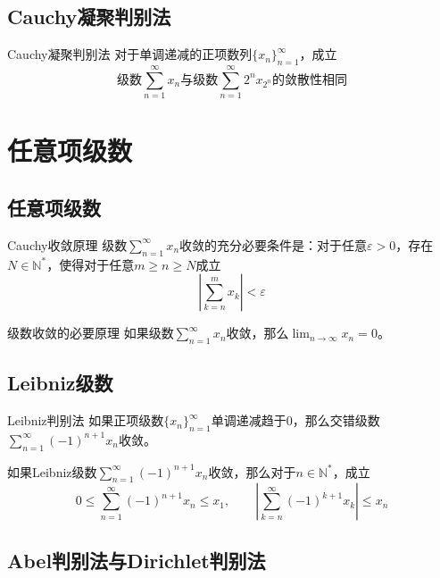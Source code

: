 \documentclass[lang = cn, scheme = chinese, thmcnt = section]{elegantbook}
\newcommand{\N}{\mathbb{N}}            %
\newcommand{\dis}{\displaystyle}
\begin{document}
\subsection{Cauchy凝聚判别法}

\begin{theorem}{Cauchy凝聚判别法}
	对于单调递减的正项数列$\{ x_n \}_{n=1}^{\infty}$，成立%
	$$
	\text{级数}\sum_{n=1}^{\infty}x_n\text{与}
	\text{级数}\sum_{n=1}^{\infty}2^nx_{2^n}\text{的敛散性相同}
	$$
\end{theorem}

\section{任意项级数}

\subsection{任意项级数}

\begin{theorem}{Cauchy收敛原理}
	级数$\dis \sum_{n=1}^{\infty}x_n$收敛的充分必要条件是：对于任意$\varepsilon>0$，存在$N\in\N^*$，使得对于任意$m\ge n\ge N$成立
	$$
	\left| \sum_{k=n}^{m}x_k \right|<\varepsilon
	$$
\end{theorem}

\begin{corollary}{级数收敛的必要原理}
	如果级数$\dis \sum_{n=1}^{\infty}x_n$收敛，那么$\dis \lim_{n\to\infty}x_n=0$。
\end{corollary}

\subsection{Leibniz级数}

\begin{theorem}{Leibniz判别法}
	如果正项级数$\{x_n\}_{n=1}^{\infty}$单调递减趋于$0$，那么交错级数$\dis \sum_{n=1}^{\infty}(-1)^{n+1}x_n$收敛。
\end{theorem}

\begin{corollary}
	如果Leibniz级数$\dis \sum_{n=1}^{\infty}(-1)^{n+1}x_n$收敛，那么对于$n\in\N^*$，成立
	$$
	0\le\sum_{n=1}^{\infty}(-1)^{n+1}x_n\le x_1,\qquad 
	\left| \sum_{k=n}^{\infty}(-1)^{k+1}x_k \right|\le x_n
	$$
\end{corollary}

\subsection{Abel判别法与Dirichlet判别法}
\end{document}
